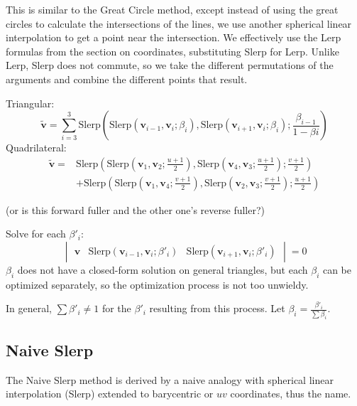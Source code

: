 \documentclass{amsart}[12pt]
\begin{document}
This is similar to the Great Circle method, except instead of using the great
circles to calculate the intersections of the lines, we use another spherical
linear interpolation to get a point near the intersection. We effectively use
the Lerp formulas from the section on coordinates, substituting Slerp for Lerp.
Unlike Lerp, Slerp does not commute, so we take the different permutations of
the arguments and combine the different points that result.

Triangular:
\begin{equation}\label{eq:fullert}
\widetilde{\mathbf v} = \sum^3_{i=3} \mathrm{Slerp}(
\mathrm{Slerp}(\mathbf v_{i-1}, \mathbf v_i; \beta_{i}),
\mathrm{Slerp}(\mathbf v_{i+1}, \mathbf v_i; \beta_{i});
\frac{\beta_{i-1}}{1-\beta{i}})
\end{equation}
Quadrilateral:%
\begin{equation}\label{eq:fullerq}
  \begin{split}
\widetilde{\mathbf v} =& \mathrm{Slerp}(
\mathrm{Slerp}(\mathbf v_1, \mathbf v_2; \frac{u+1}{2}),
\mathrm{Slerp}(\mathbf v_4, \mathbf v_3; \frac{u+1}{2}); \frac{v+1}{2})\\
&+ \mathrm{Slerp}(
\mathrm{Slerp}(\mathbf v_1, \mathbf v_4; \frac{v+1}{2}),
\mathrm{Slerp}(\mathbf v_2, \mathbf v_3; \frac{v+1}{2}); \frac{u+1}{2})
\end{split}
\end{equation}

(or is this forward fuller and the other one's reverse fuller?)

Solve for each $\beta'_i$:
\begin{equation}
\begin{vmatrix} \mathbf v &
\mathrm{Slerp}(\mathbf v_{i-1}, \mathbf v_i; \beta'_i) &
\mathrm{Slerp}(\mathbf v_{i+1}, \mathbf v_i; \beta'_i) \end{vmatrix} = 0
\end{equation}
$\beta_i$ does not have a closed-form solution on general triangles,
but each $\beta_i$ can be optimized separately,
so the optimization process is not too unwieldy.

In general, $\sum \beta'_i \ne 1$ for the $\beta'_i$ resulting from this
process. Let $\beta_i = \frac{\beta'_i }{\sum \beta_i}$.

\subsection{Naive Slerp}
The Naive Slerp method is derived by a naive analogy with spherical linear
interpolation (Slerp) extended to barycentric or $uv$ coordinates, thus the
name.
\end{document}
